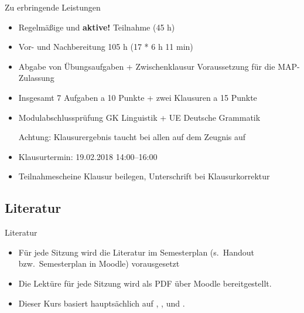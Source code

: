 \begin{frame}{Zu erbringende Leistungen}

	\begin{itemize}
	\item Regelmäßige und \textbf{aktive!} Teilnahme (45 h)
        \item Vor- und Nachbereitung 105 h (17 * 6 h 11 min)
	\item Abgabe von Übungsaufgaben + Zwischenklausur \ras Voraussetzung für die MAP-Zulassung

        \item Insgesamt 7 Aufgaben a 10 Punkte + zwei Klausuren a 15 Punkte

	\item Modulabschlussprüfung \ras GK Linguistik + UE Deutsche Grammatik

              Achtung: Klausurergebnis taucht bei allen auf dem Zeugnis auf

        \item Klausurtermin: 19.02.2018 14:00--16:00
        \item Teilnahmescheine Klausur beilegen, Unterschrift bei Klausurkorrektur
              
	\end{itemize}
	
\end{frame}


%
\subsection{Literatur}

\begin{frame}{Literatur}

\begin{itemize}
	\item Für jede Sitzung wird die Literatur im Semesterplan (s.\ Handout bzw.\ Semesterplan in Moodle) vorausgesetzt
	\item Die Lektüre für jede Sitzung wird als PDF über Moodle bereitgestellt.
\bigskip

	\item Dieser Kurs basiert hauptsächlich auf , ,  und \citet{Abramowski2016}.
\end{itemize}		

\end{frame}

